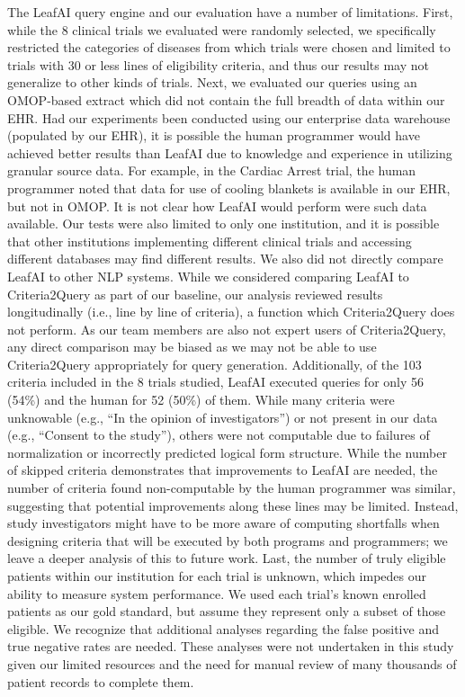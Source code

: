 \documentclass[../main.tex]{subfiles}
\begin{document}
The LeafAI query engine and our evaluation have a number of limitations. First, while the 8 clinical trials we evaluated were randomly selected, we specifically restricted the categories of diseases from which trials were chosen and limited to trials with 30 or less lines of eligibility criteria, and thus our results may not generalize to other kinds of trials. Next, we evaluated our queries using an OMOP-based extract which did not contain the full breadth of data within our EHR. Had our experiments been conducted using our enterprise data warehouse (populated by our EHR), it is possible the human programmer would have achieved better results than LeafAI due to knowledge and experience in utilizing granular source data. For example, in the Cardiac Arrest trial, the human programmer noted that data for use of cooling blankets is available in our EHR, but not in OMOP. It is not clear how LeafAI would perform were such data available. Our tests were also limited to only one institution, and it is possible that other institutions implementing different clinical trials and accessing different databases may find different results. We also did not directly compare LeafAI to other NLP systems. While we considered comparing LeafAI to Criteria2Query \cite{yuan2019criteria2query} as part of our baseline, our analysis reviewed results longitudinally (i.e., line by line of criteria), a function which Criteria2Query does not perform. As our team members are also not expert users of Criteria2Query, any direct comparison may be biased as we may not be able to use Criteria2Query appropriately for query generation. Additionally, of the 103 criteria included in the 8 trials studied, LeafAI executed queries for only 56 (54\%) and the human for 52 (50\%) of them. While many criteria were unknowable (e.g., “In the opinion of investigators”) or not present in our data (e.g., “Consent to the study”), others were not computable due to failures of normalization or incorrectly predicted logical form structure. While the number of skipped criteria demonstrates that improvements to LeafAI are needed, the number of criteria found non-computable by the human programmer was similar, suggesting that potential improvements along these lines may be limited. Instead, study investigators might have to be more aware of computing shortfalls when designing criteria that will be executed by both programs and programmers; we leave a deeper analysis of this to future work. Last, the number of truly eligible patients within our institution for each trial is unknown, which impedes our ability to measure system performance. We used each trial’s known enrolled patients as our gold standard, but assume they represent only a subset of those eligible. We recognize that additional analyses regarding the false positive and true negative rates are needed. These analyses were not undertaken in this study given our limited resources and the need for manual review of many thousands of patient records to complete them.
\end{document}

